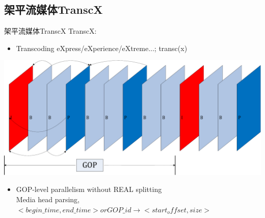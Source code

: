 \documentclass{beamer}
\begin{document}
\subsection{架平流媒体TranscX}
\begin{frame}{架平流媒体TranscX}
TranscX: 
\begin{itemize}
	\item Transcoding eXpress/eXperience/eXtreme...; transc(x)
\end{itemize}
\begin{center}
\includegraphics[scale=0.20]{fig/GOP.pdf}
\end{center}
\begin{itemize}
\item GOP-level parallelism without REAL splitting\\
Media head parsing, $<begin\_time, end\_time> or GOP\_id \rightarrow <start_offset, size>$
\end{itemize}
\end{frame}
\end{document}

